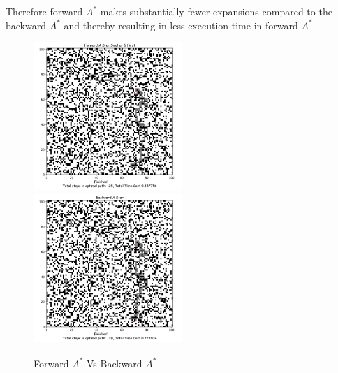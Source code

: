 \documentclass{article}
\begin{document}
Therefore forward $A^*$ makes substantially fewer expansions compared to the backward $A^*$ and thereby resulting in less execution time in forward $A^*$\\
\begin{figure}[h!]
\includegraphics[width=0.5\textwidth, inner]{fsmg1}
\includegraphics[width=0.5\textwidth, right]{fg1}
\caption{Forward $A^*$ Vs Backward $A^*$}
\label{fig:figure2}
\end{figure}
\end{document}
